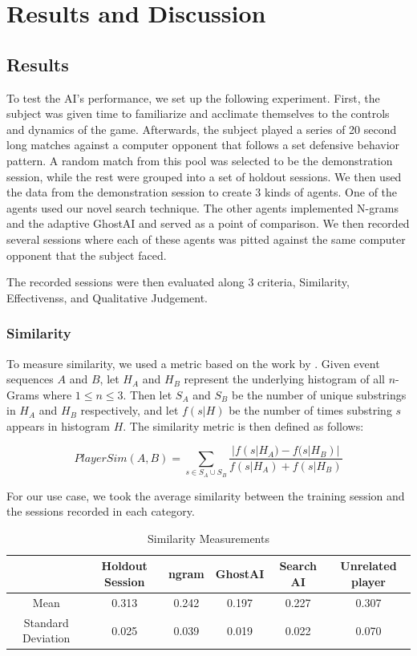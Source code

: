 
\chapter{Results and Discussion}

\label{Chapter5} %

\section{Results}

To test the AI's performance, we set up the following experiment. First, the subject was given time to familiarize and acclimate themselves to the controls and dynamics of the game. Afterwards, the subject played a series of 20 second long matches against a computer opponent that follows a set defensive behavior pattern. A random match from this pool was selected to be the demonstration session, while the rest were grouped into a set of holdout sessions. We then used the data from the demonstration session to create 3 kinds of agents. One of the agents used our novel search technique. The other agents implemented N-grams and the adaptive GhostAI and served as a point of comparison. We then recorded several sessions where each of these agents was pitted against the same computer opponent that the subject faced.

The recorded sessions were then evaluated along 3 criteria, Similarity, Effectivenss, and Qualitative Judgement.

\subsection{Similarity}

To measure similarity, we used a metric based on the work by \cite{simil}. Given event sequences $A$ and $B$, let $H_A$ and $H_B$ represent the underlying histogram of all $n$-Grams where $1 \le n \le 3$. Then let $S_A$ and $S_B$ be the number of unique substrings in $H_A$ and $H_B$ respectively, and let $f(s|H)$ be the number of times substring $s$ appears in histogram $H$. The similarity metric is then defined as follows:

$$PlayerSim(A,B) = \sum_{s \in S_A \cup S_B} \frac{|f(s|H_A) - f(s|H_B)|}{f(s|H_A) + f(s|H_B)}$$

For our use case, we took the average similarity between the training session and the sessions recorded in each category.

\begin{table}[h]
	\centering
	\caption{ Similarity Measurements }
	\begin{tabular}	{| c | c | c | c | c | c |}
		\hline
		 & Holdout Session & ngram & GhostAI & Search AI & Unrelated player\\
		\hline
		Mean &
		0.313 & 
		0.242 &
		0.197 &
		0.227 &
		0.307 		\\
		\hline
		Standard Deviation & 
		0.025 & 
		0.039 &
		0.019 &
		0.022 &
		0.070 		\\
		\hline
	\end{tabular}
	\label{Similarity}
\end{table}


